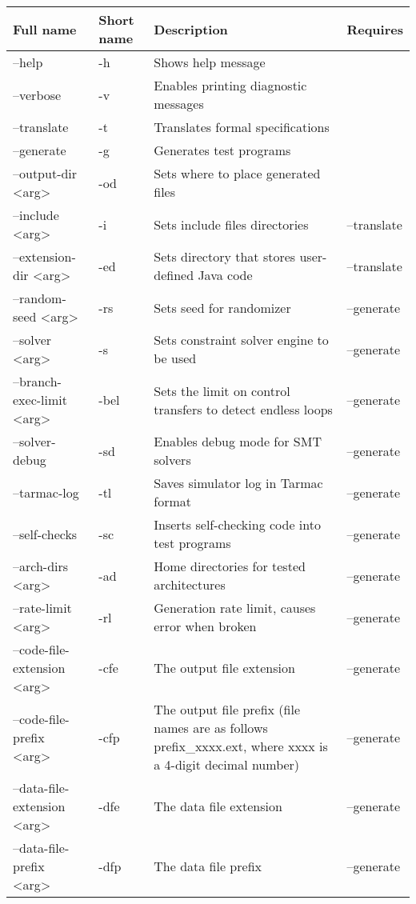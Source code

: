 \documentclass[oneside,final,14pt]{extreport}
\begin{document}
\begin{tabular}{ | p{4cm} | p{1cm} | p{5cm} | p{3cm} |}
  \hline
  Full name & Short name & Description & Requires \\ \hline
  --help & -h & Shows help message & \\ \hline
  --verbose & -v & Enables printing diagnostic messages & \\ \hline
  --translate & -t & Translates formal specifications & \\ \hline
  --generate & -g & Generates test programs & \\ \hline
  --output-dir <arg> & -od & Sets where to place generated files & \\ \hline
  --include <arg> & -i & Sets include files directories & --translate \\ \hline
  --extension-dir <arg> & -ed & Sets directory that stores user-defined Java code & --translate \\ \hline
  --random-seed <arg> & -rs & Sets seed for randomizer & --generate \\ \hline
  --solver <arg> & -s & Sets constraint solver engine to be used & --generate \\ \hline
  --branch-exec-limit <arg> & -bel & Sets the limit on control transfers to detect endless loops & --generate \\ \hline
  --solver-debug & -sd & Enables debug mode for SMT solvers & --generate \\ \hline
  --tarmac-log  & -tl & Saves simulator log in Tarmac format & --generate \\ \hline
  --self-checks & -sc & Inserts self-checking code into test programs & --generate \\ \hline
  --arch-dirs <arg> & -ad & Home directories for tested architectures & --generate \\ \hline
  --rate-limit <arg> & -rl & Generation rate limit, causes error when broken & --generate \\ \hline
  --code-file-extension <arg> & -cfe & The output file extension & --generate \\ \hline
  --code-file-prefix <arg> & -cfp & The output file prefix (file names are as follows prefix{\_}xxxx.ext, where xxxx is a 4-digit decimal number) & --generate \\ \hline
  --data-file-extension <arg> & -dfe & The data file extension & --generate \\ \hline
  --data-file-prefix <arg> & -dfp & The data file prefix & --generate \\ \hline

\end{tabular}
\end{document}

